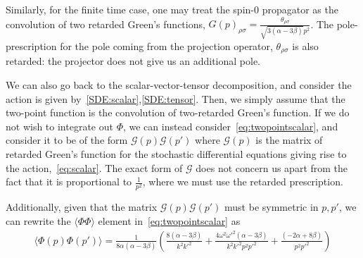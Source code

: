 \documentclass[aps,preprintnumbers,superscriptaddress,longbibliography]{revtex4-1}
\begin{document}
Similarly, for the finite time case, one may treat the spin-0 propagator as the convolution of two retarded Green's functions, $G(p)_{\rho\sigma}=\frac{\theta_{\rho\sigma}}{\sqrt{3(\alpha-3\beta)}p^2}$. The pole-prescription for the pole coming from the projection operator, $\theta_{\rho\sigma}$ is also retarded: the projector does not give us an additional pole.

We can also go back to the scalar-vector-tensor decomposition, and consider the action is given by~\eqref{SDE:scalar},\eqref{SDE:tensor}. Then, we simply assume that the two-point function is the convolution of two-retarded Green's function. If we do not wish to integrate out $\Phi$, we can instead consider~\eqref{eq:twopointscalar}, and consider it to be of the form $\mathcal{G}(p)\mathcal{G}(p')$ where $\mathcal{G}(p)$ is the matrix of retarded Green's function for the stochastic differential equations giving rise to the action,~\eqref{eq:scalar}. The exact form of $\mathcal{G}$ does not concern us apart from the fact that it is proportional to $\frac{1}{p^2}$, where we must use the retarded prescription.

Additionally, given that the matrix $\mathcal{G}(p)\mathcal{G}(p')$ must be symmetric in $p,p'$, we can rewrite the $\langle\Phi\Phi\rangle$ element in~\eqref{eq:twopointscalar} as 
\begin{align}
    \langle\Phi(p)\Phi(p')\rangle=\frac{1}{8\alpha(\alpha-3\beta)} (\frac{8(\alpha-3\beta)}{k^2k'^2}+\frac{4\omega^2\omega'^2(\alpha-3\beta)}{k^2k'^2p^2p'^2}+\frac{(-2\alpha+8\beta)}{p^2p'^2})
\end{align}
\end{document}
